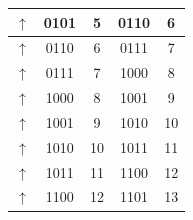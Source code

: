 \documentclass[pdftex,12pt,a4paper]{article}
\begin{document}
\begin{table}[H]
\begin{tabular}{|c|c|c|c|c|}
$\uparrow$                                                                 & 0101                                                      & 5                                                         & 0110                                                   & 6                                                       \\ \hline
$\uparrow$                                                                 & 0110                                                      & 6                                                         & 0111                                                   & 7                                                       \\ \hline
$\uparrow$                                                                 & 0111                                                      & 7                                                         & 1000                                                   & 8                                                       \\ \hline
$\uparrow$                                                                 & 1000                                                      & 8                                                         & 1001                                                   & 9                                                       \\ \hline
$\uparrow$                                                                 & 1001                                                      & 9                                                         & 1010                                                   & 10                                                      \\ \hline
$\uparrow$                                                                 & 1010                                                      & 10                                                        & 1011                                                   & 11                                                      \\ \hline
$\uparrow$                                                                 & 1011                                                      & 11                                                        & 1100                                                   & 12                                                      \\ \hline
$\uparrow$                                                                 & 1100                                                      & 12                                                        & 1101                                                   & 13                                                      \\ \hline

\end{tabular}
\end{table}
\end{document}
